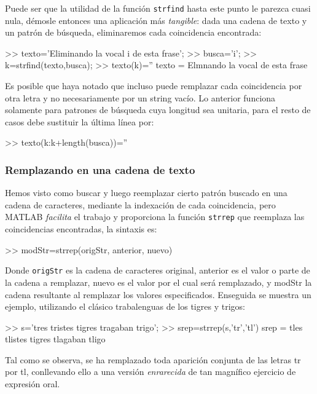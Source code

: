 Puede ser que la utilidad de la función \texttt{strfind} hasta este punto le
parezca cuasi nula, démosle entonces una aplicación más \emph{tangible}:
dada una cadena de texto y un patrón de búsqueda, eliminaremos cada
coincidencia encontrada:

\begin{matlab}
>> texto='Eliminando la vocal i de esta frase';
>> busca='i';
>> k=strfind(texto,busca);
>> texto(k)='' %
texto =
Elmnando la vocal  de esta frase
\end{matlab}

Es posible que haya notado que incluso puede remplazar cada coincidencia
por otra letra y no necesariamente por un string vacío. Lo anterior
funciona solamente para patrones de búsqueda cuya longitud sea unitaria,
para el resto de casos debe sustituir la última línea por:

\begin{matlab}
>> texto(k:k+length(busca))=''
\end{matlab}

\subsubsection{Remplazando en una cadena de texto}\label{remplazando-en-una-cadena-de-texto}

Hemos visto como buscar y luego reemplazar cierto patrón buscado en una
cadena de caracteres, mediante la indexación de cada coincidencia, pero
MATLAB \emph{facilita} el trabajo y proporciona la función
\texttt{strrep} que reemplaza las coincidencias encontradas, la sintaxis
es:

\begin{matlab}
>> modStr=strrep(origStr,  anterior, nuevo)
\end{matlab}

Donde \texttt{origStr} es la cadena de caracteres original, anterior es el valor
o parte de la cadena a remplazar, nuevo es el valor por el cual será
remplazado, y modStr la cadena resultante al remplazar los valores
especificados. Enseguida se muestra un ejemplo, utilizando el clásico
trabalenguas de los tigres y trigos:

\begin{matlab}
>> s='tres tristes tigres tragaban trigo';
>> srep=strrep(s,'tr','tl')
srep =
tles tlistes tigres tlagaban tligo
\end{matlab}

Tal como se observa, se ha remplazado toda aparición conjunta de las
letras tr por tl, conllevando ello a una versión \emph{enrarecida} de
tan magnífico ejercicio de expresión oral. \\

